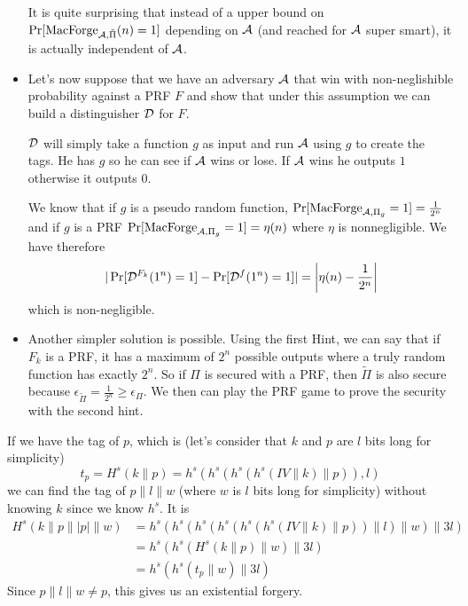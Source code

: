 \begin{solution}
\begin{itemize}
      It is quite surprising that instead of a upper bound
      on $\Pr[\operatorname{MacForge}_{\mathcal{A}, \tilde{\Pi}}(n) = 1]$
      depending on $\mathcal{A}$ (and reached for $\mathcal{A}$ super smart),
      it is actually independent of $\mathcal{A}$.
    \item
      Let's now suppose that we have an adversary $\mathcal{A}$
      that win with non-neglishible probability against a PRF $F$
      and show that under this assumption we can build
      a distinguisher $\mathcal{D}$ for $F$.

      $\mathcal{D}$ will simply take a function $g$ as input
      and run $\mathcal{A}$ using $g$ to create the tags.
      He has $g$ so he can see if $\mathcal{A}$ wins or lose.
      If $\mathcal{A}$ wins he outputs $1$ otherwise it outputs $0$.

      We know that if $g$ is a pseudo random function,
      $\Pr[\operatorname{MacForge}_{\mathcal{A}, \Pi_g} = 1] = \frac{1}{2^n}$
      and if $g$ is a PRF
      $\Pr[\operatorname{MacForge}_{\mathcal{A}, \Pi_g} = 1] = \eta(n)$
      where $\eta$ is nonnegligible.
      We have therefore
      \[
        |\Pr[\mathcal{D}^{F_k}(1^n) = 1] - \Pr[\mathcal{D}^{f}(1^n) = 1]|
        = \left|\eta(n) - \frac{1}{2^n}\right|
      \]
      which is non-negligible.

    \item
      Another simpler solution is possible. Using the first Hint, we can say that if $F_k$ is a PRF, it has a maximum of $2^n$ possible outputs 
      where a truly random function has exactly $2^n$. So if $\Pi$ is secured with a PRF, then $\tilde{\Pi}$ is also secure because 
      $\epsilon_{\tilde{\Pi}}  = \frac{1}{2^n} \geq \epsilon_{\Pi}$. We then can play the PRF game to prove the security with the second hint.

  \end{itemize}

\end{solution}

\begin{solution}
  If we have the tag of $p$, which is (let's consider that $k$ and $p$ are $l$ bits long for simplicity)
  \[ t_p = H^s(k\|p) = h^s(h^s(h^s(h^s(IV \| k) \| p)), l) \]
  we can find the tag of $p\|l\|w$ (where $w$ is $l$ bits long for simplicity)
  without knowing $k$ since we know $h^s$.
  It is
  \begin{align*}
    H^s(k\|p\||p|\|w)
    & = h^s(h^s(h^s(h^s(h^s(h^s(IV \| k) \| p)) \| l) \| w) \| 3l)\\
    & = h^s(h^s(H^s(k \| p) \| w) \| 3l)\\
    & = h^s(h^s(t_p \| w) \| 3l)
  \end{align*}
  Since $p\|l\|w \neq p$, this gives us an existential forgery.
\end{solution}

